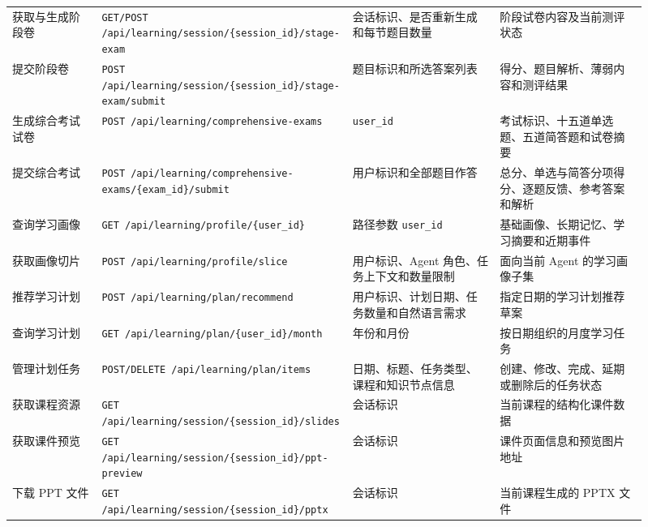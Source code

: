 {\begin{longtable}{
  p{0.14\linewidth}
  p{0.31\linewidth}
  p{0.23\linewidth}
  p{0.23\linewidth}
}
  获取与生成阶段卷
  & \texttt{GET/POST /api/learning/session/\{session\_id\}/stage-exam}
  & 会话标识、是否重新生成和每节题目数量
  & 阶段试卷内容及当前测评状态 \\

  提交阶段卷
  & \texttt{POST /api/learning/session/\{session\_id\}/stage-exam/submit}
  & 题目标识和所选答案列表
  & 得分、题目解析、薄弱内容和测评结果 \\

  生成综合考试试卷
  & \texttt{POST /api/learning/comprehensive-exams}
  & \texttt{user\_id}
  & 考试标识、十五道单选题、五道简答题和试卷摘要 \\

  提交综合考试
  & \texttt{POST /api/learning/comprehensive-exams/\{exam\_id\}/submit}
  & 用户标识和全部题目作答
  & 总分、单选与简答分项得分、逐题反馈、参考答案和解析 \\

  查询学习画像
  & \texttt{GET /api/learning/profile/\{user\_id\}}
  & 路径参数 \texttt{user\_id}
  & 基础画像、长期记忆、学习摘要和近期事件 \\

  获取画像切片
  & \texttt{POST /api/learning/profile/slice}
  & 用户标识、Agent 角色、任务上下文和数量限制
  & 面向当前 Agent 的学习画像子集 \\

  推荐学习计划
  & \texttt{POST /api/learning/plan/recommend}
  & 用户标识、计划日期、任务数量和自然语言需求
  & 指定日期的学习计划推荐草案 \\

  查询学习计划
  & \texttt{GET /api/learning/plan/\{user\_id\}/month}
  & 年份和月份
  & 按日期组织的月度学习任务 \\

  管理计划任务
  & \texttt{POST/DELETE /api/learning/plan/items}
  & 日期、标题、任务类型、课程和知识节点信息
  & 创建、修改、完成、延期或删除后的任务状态 \\

  获取课程资源
  & \texttt{GET /api/learning/session/\{session\_id\}/slides}
  & 会话标识
  & 当前课程的结构化课件数据 \\

  获取课件预览
  & \texttt{GET /api/learning/session/\{session\_id\}/ppt-preview}
  & 会话标识
  & 课件页面信息和预览图片地址 \\

  下载 PPT 文件
  & \texttt{GET /api/learning/session/\{session\_id\}/pptx}
  & 会话标识
  & 当前课程生成的 PPTX 文件 \\


\end{longtable}}
